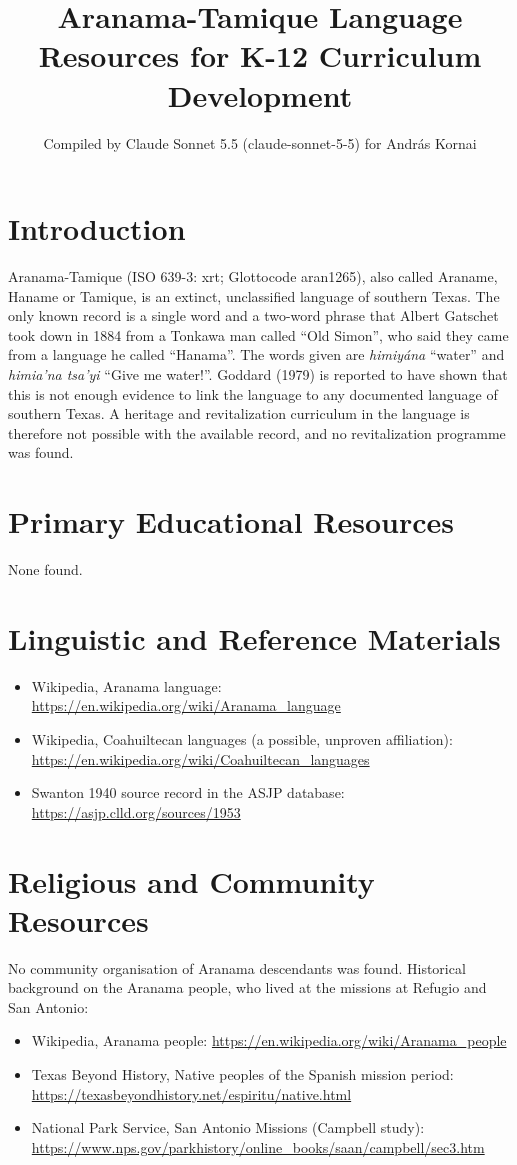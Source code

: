 \documentclass[12pt]{article}
\title{Aranama-Tamique Language Resources for K-12 Curriculum Development}
\author{Compiled by Claude Sonnet 5.5 (claude-sonnet-5-5) for Andr\'as Kornai}
\date{}
\begin{document}
\maketitle

\section{Introduction}
Aranama-Tamique (ISO 639-3: xrt; Glottocode aran1265), also called Araname, Haname or Tamique, is an extinct, unclassified language of southern Texas. The only known record is a single word and a two-word phrase that Albert Gatschet took down in 1884 from a Tonkawa man called ``Old Simon'', who said they came from a language he called ``Hanama''. The words given are \emph{himiy\'ana} ``water'' and \emph{himia'na tsa'yi} ``Give me water!''. Goddard (1979) is reported to have shown that this is not enough evidence to link the language to any documented language of southern Texas. A heritage and revitalization curriculum in the language is therefore not possible with the available record, and no revitalization programme was found.

\section{Primary Educational Resources}
None found.

\section{Linguistic and Reference Materials}
\begin{itemize}
\item Wikipedia, Aranama language: \url{https://en.wikipedia.org/wiki/Aranama_language}
\item Wikipedia, Coahuiltecan languages (a possible, unproven affiliation): \url{https://en.wikipedia.org/wiki/Coahuiltecan_languages}
\item Swanton 1940 source record in the ASJP database: \url{https://asjp.clld.org/sources/1953}
\end{itemize}

\section{Religious and Community Resources}
No community organisation of Aranama descendants was found. Historical background on the Aranama people, who lived at the missions at Refugio and San Antonio:
\begin{itemize}
\item Wikipedia, Aranama people: \url{https://en.wikipedia.org/wiki/Aranama_people}
\item Texas Beyond History, Native peoples of the Spanish mission period: \url{https://texasbeyondhistory.net/espiritu/native.html}
\item National Park Service, San Antonio Missions (Campbell study): \url{https://www.nps.gov/parkhistory/online_books/saan/campbell/sec3.htm}
\end{itemize}
\end{document}
